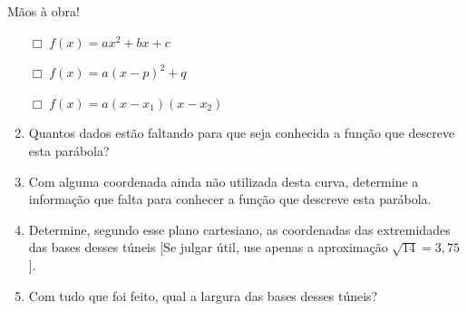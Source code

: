 \begin{task}{Mãos à obra!}
\begin{enumerate}
\(\Box \; f(x)=ax^2+bx+c\)

\(\Box \; f(x)=a(x-p)^2+q\)

\(\Box \; f(x)=a(x-x_1)(x-x_2)\)

\item {} 
Quantos dados estão faltando para que seja conhecida a função que descreve esta parábola?

\item {} 
Com alguma coordenada ainda não utilizada desta curva, determine a informação que falta para conhecer a função que descreve esta parábola.

\item {} 
Determine, segundo esse plano cartesiano, as coordenadas das extremidades das bases desses túneis {[}Se julgar útil, use apenas a aproximação \(\sqrt{14}=3,75\){]}.

\item {} 
Com tudo que foi feito, qual a largura das bases desses túneis?

\end{enumerate}
\end{task}


